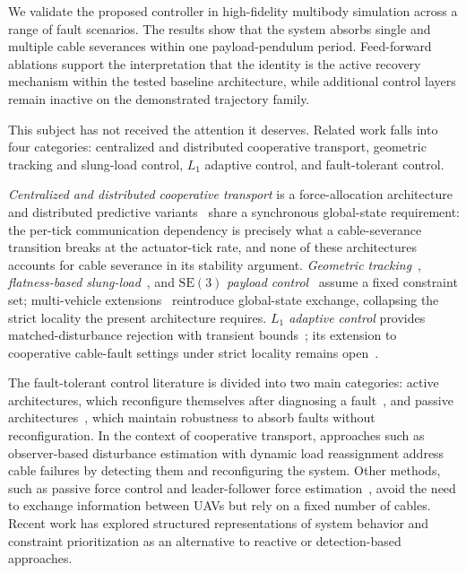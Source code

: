We validate the proposed controller in high-fidelity multibody simulation across a range of fault scenarios. The results show that the system absorbs single and multiple cable severances within one payload-pendulum period. Feed-forward ablations support the interpretation that the identity is the active recovery mechanism within the tested baseline architecture, while additional control layers remain inactive on the demonstrated trajectory family.

This subject has not received the attention it deserves. Related work falls into four categories: centralized and distributed cooperative transport, geometric tracking and slung-load control, $L_1$ adaptive control, and fault-tolerant control.

\textit{Centralized and distributed cooperative transport} is a force-allocation architecture~\cite{Michael2011,Fink2011,Tagliabue2019} and distributed predictive variants~\cite{WangOng2017,LiLoianno2023,PallarLi2025,SuBhowmick2023} share a synchronous global-state requirement: the per-tick communication dependency is precisely what a cable-severance transition breaks at the actuator-tick rate, and none of these architectures accounts for cable severance in its stability argument. \textit{Geometric tracking}~\cite{LeeLeokMcClamroch2010}, \textit{flatness-based slung-load}~\cite{Sreenath2013}, and $\mathrm{SE}(3)$ \textit{payload control}~\cite{Lee2018} assume a fixed constraint set; multi-vehicle extensions~\cite{LeeSreenathKumar2013,SharmaSundaram2023} reintroduce global-state exchange, collapsing the strict locality the present architecture requires. \textit{$L_1$ adaptive control} provides matched-disturbance rejection with transient bounds~\cite{CaoHovakimyan2008,Hovakimyan2010book}; its extension to cooperative cable-fault settings under strict locality remains open~\cite{WuCheng2025}.

The fault-tolerant control literature is divided into two main categories: active architectures, which reconfigure themselves after diagnosing a fault~\cite{Blanke2015,ZhangJiang2008}, and passive architectures~\cite{Patton1997,Blanke2015}, which maintain robustness to absorb faults without reconfiguration\cite{LiuSuspensionFailure2021}. In the context of cooperative transport, approaches such as observer-based disturbance estimation with dynamic load reassignment address cable failures by detecting them and reconfiguring the system. Other methods, such as passive force control and leader-follower force estimation~\cite{NoCommTransport2021}, avoid the need to exchange information between UAVs but rely on a fixed number of cables.  Recent work has explored structured representations of system behavior and constraint prioritization as an alternative to reactive or detection-based approaches.~\cite{rulebooks}


